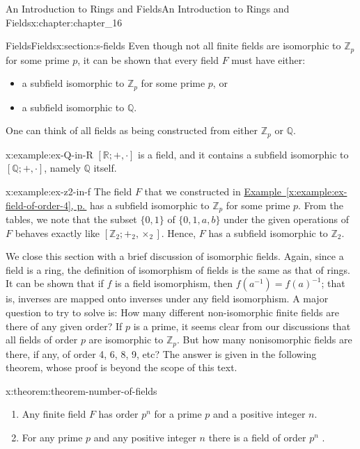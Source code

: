 \documentclass[twoside,10pt,]{book}
\newcommand{\xreffont}{\relax}
\numberwithin{equation}{section}
\begin{document}
\begin{chapterptx}{An Introduction to Rings and Fields}{}{An Introduction to Rings and Fields}{}{}{x:chapter:chapter_16}
\begin{sectionptx}{Fields}{}{Fields}{}{}{x:section:s-fields}
Even though not all finite fields are isomorphic to \(\mathbb{Z}_p\) for some prime \(p\), it can be shown that every field \(F\) must have either:%
\begin{itemize}[label=\textbullet]
\item{}a subfield isomorphic to \(\mathbb{Z}_p\) for some prime \(p\), or%
\item{}a subfield isomorphic to \(\mathbb{Q}\).%
\end{itemize}
%
\par
One can think of all fields as being constructed from either \(\mathbb{Z}_p\) or \(\mathbb{Q}\).%
\begin{example}{}{x:example:ex-Q-in-R}%
\([\mathbb{R}; +, \cdot]\) is a field, and it contains a subfield isomorphic to \([\mathbb{Q}; +, \cdot]\), namely \(\mathbb{Q}\) itself.%
\end{example}
\begin{example}{}{x:example:ex-z2-in-f}%
The field \(F\) that we constructed in \hyperref[x:example:ex-field-of-order-4]{Example~{\xreffont\ref{x:example:ex-field-of-order-4}}, p.\,\pageref{x:example:ex-field-of-order-4}} has a subfield isomorphic to \(\mathbb{Z}_p\) for some prime \(p\).  From the tables, we note that the subset \(\{0, 1\}\) of \(\{0, 1, a, b\}\) under the given operations of \(F\) behaves exactly like \(\left[\mathbb{Z}_2; +_2,\times _2\right]\).  Hence, \(F\) has a subfield isomorphic to \(\mathbb{Z}_2\).%
\end{example}
We close this section with a brief discussion of isomorphic fields. Again, since a field is a ring, the definition of isomorphism of fields is the same as that of rings. It can be shown that if \(f\) is a field isomorphism, then \(f\left(a^{-1} \right) = f(a)^{-1}\); that is, inverses are mapped onto inverses under any field isomorphism. A major question to try to solve is: How many different non-isomorphic finite fields are there of any given order? If \(p\) is a prime, it seems clear from our discussions that all fields of order \(p\) are isomorphic to \(\mathbb{Z}_p\). But how many nonisomorphic fields are there, if any, of order 4, 6, 8, 9, etc? The answer is given in the following theorem, whose proof is beyond the scope of this text.%
\begin{theorem}{}{}{x:theorem:theorem-number-of-fields}%
%
\begin{enumerate}[label=(\arabic*)]
\item{}Any finite field \(F\) has order \(p^n\) for a prime \(p\) and a positive integer \(n\).%
\item{}For any prime \(p\) and any positive integer \(n\) there is a field of order \(p^n\) .%

\end{enumerate}
\end{theorem}
\end{sectionptx}
\end{chapterptx}
\end{document}
